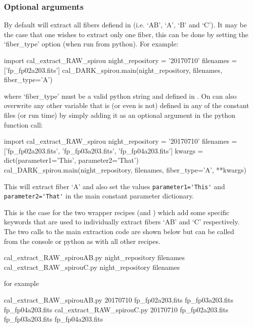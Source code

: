 \subsubsection{Optional arguments}

By default \calextractRAW will extract all fibers defiend in  (i.e. `AB', `A', `B' and `C'). It may be the case that one wishes to extract only one fiber, this can be done by setting the `fiber\_type' option (when run from python). For example:
\begin{pythonbox}
import cal_extract_RAW_spirou
night_repository = '20170710'
filenames = ['fp_fp02a203.fits']
cal_DARK_spirou.main(night_repository, filenames, fiber_type='A')
\end{pythonbox}
\noindent where `fiber\_type' must be a valid python string and defined in . On can also overwrite any other variable that is (or even is not) defined in any of the constant files (or run time) by simply adding it as an optional argument in the python function call:
\begin{pythonbox}
import cal_extract_RAW_spirou
night_repository = '20170710'
filenames = ['fp_fp02a203.fits', 'fp_fp03a203.fits', 'fp_fp04a203.fits']
kwargs = dict(parameter1='This', parameter2='That')
cal_DARK_spirou.main(night_repository, filenames, fiber_type='A', **kwargs)
\end{pythonbox}
\begin{note}
This will extract fiber `A' and also set the values \lstinline[style=pythoninline]|parameter1='This'| and \lstinline[style=pythoninline]|parameter2='That'| in the main constant parameter dictionary.
\end{note}
\noindent This is the case for the two wrapper recipes (\calextractRAWAB and \calextractRAWC) which add some specific keywords that are used to individually extract fibers `AB' and `C' respectively. The two calls to the main extraction code are shown below but can be called from the console or python as with all other recipes.
\begin{cmdbox}
cal_extract_RAW_spirouAB.py night_repository filenames
cal_extract_RAW_spirouC.py night_repository filenames
\end{cmdbox}
\noindent for example
\begin{cmdbox}[title={example}]
cal_extract_RAW_spirouAB.py 20170710 fp_fp02a203.fits fp_fp03a203.fits fp_fp04a203.fits
cal_extract_RAW_spirouC.py 20170710 fp_fp02a203.fits fp_fp03a203.fits fp_fp04a203.fits
\end{cmdbox}
